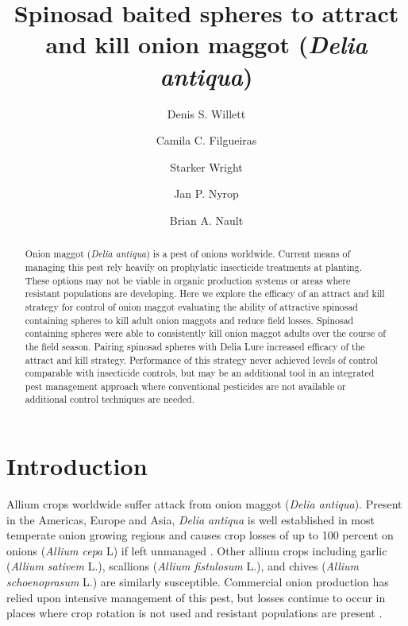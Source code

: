 \documentclass[alpha-refs]{wiley-article}
\title{Spinosad baited spheres to attract and kill onion maggot (\textit{Delia antiqua})}
\author[1\authfn{1}]{Denis S. Willett}
\author[1\authfn{1}]{Camila C. Filgueiras}
\author[2]{Starker Wright}
\author[1]{Jan P. Nyrop}
\author[1]{Brian A. Nault}
\affil[1]{Department of Entomology, Cornell AgriTech, Cornell University, Geneva, NY, 14456, USA}
\affil[2]{Bartlett Tree Experts, Dublin, PA, USA}
\begin{document}
\maketitle

\begin{abstract}

Onion maggot (\textit{Delia antiqua}) is a pest of onions worldwide.  Current means of managing this pest rely heavily on prophylatic insecticide treatments at planting.  These options may not be viable in organic production systems or areas where resistant populations are developing.  Here we explore the efficacy of an attract and kill strategy for control of onion maggot evaluating the ability of attractive spinosad containing spheres to kill adult onion maggots and reduce field losses.  Spinosad containing spheres were able to consistently kill onion maggot adults over the course of the field season.  Pairing spinosad spheres with Delia Lure increased efficacy of the attract and kill strategy.  Performance of this strategy never achieved levels of control comparable with insecticide controls, but may be an additional tool in an integrated pest management approach where conventional pesticides are not available or additional control techniques are needed.  

\end{abstract}

\linenumbers
\section{Introduction}

Allium crops worldwide suffer attack from onion maggot (\textit{Delia antiqua}).  Present in the Americas, Europe and Asia, \textit{Delia antiqua} is well established in most temperate onion growing regions and causes crop losses of up to 100 percent on onions (\textit{Allium cepa} L) if left unmanaged \citep{nault2006performance, nault2006onion}.  Other allium crops including garlic (\textit{Allium sativem} L.), scallions (\textit{Allium fistulosum} L.), and chives (\textit{Allium schoenoprasum} L.) are similarly susceptible\citep{ellis1979factors,ning2017predicting,nault2007ecology, }.  Commercial onion production has relied upon intensive management of this pest, but losses continue to occur in places where crop rotation is not used and resistant populations are present \citep{martinson1988dispersal, nault2006onion}.  
\end{document}

